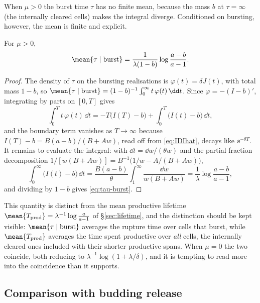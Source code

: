 When $\mu>0$ the burst time $\tau$ has no finite mean, because the mass $b$
at $\tau=\infty$ (the internally cleared cells) makes the integral diverge.
Conditioned on bursting, however, the mean is finite and explicit.

\begin{proposition}
\label{prop:tau-burst}
For $\mu>0$,
\begin{equation}
\mean{\tau\mid\text{burst}}
=\frac{1}{\lambda(1-b)}\log\frac{a-b}{a-1}.
\label{eq:tau-burst}
\end{equation}
\end{proposition}

\begin{proof}
The density of $\tau$ on the bursting realisations is $\varphi(t)=\delta J(t)$,
with total mass $1-b$, so
$\mean{\tau\mid\text{burst}}=(1-b)^{-1}\int_0^\infty t\,\varphi(t)\,\dd t$.
Since $\varphi=-(I-b)'$, integrating by parts on $[0,T]$ gives
$$\int_0^T t\,\varphi(t)\,\dd t
=-T\bigl(I(T)-b\bigr)+\int_0^T\bigl(I(t)-b\bigr)\,\dd t,$$
and the boundary term vanishes as $T\to\infty$ because
$I(T)-b=B(a-b)/(B+Aw)$, read off from \eqref{eq:IDIhat}, decays like
$\ee^{-\theta T}$. It remains to evaluate the integral: with
$\dd t=\dd w/(\theta w)$ and the partial-fraction decomposition
$1/[w(B+Aw)]=B^{-1}\bigl(1/w-A/(B+Aw)\bigr)$,
$$\int_0^\infty\bigl(I(t)-b\bigr)\,\dd t
=\frac{B(a-b)}{\theta}\int_1^\infty\frac{\dd w}{w(B+Aw)}
=\frac{1}{\lambda}\log\frac{a-b}{a-1},$$
and dividing by $1-b$ gives \eqref{eq:tau-burst}.
\end{proof}

This quantity is distinct from the mean productive lifetime
$\mean{T_{\rm prod}}=\lambda^{-1}\log\frac{a}{a-1}$ of
\S\ref{sec:lifetime}, and the distinction should be kept visible:
$\mean{\tau\mid\text{burst}}$ averages the rupture time over cells that
burst, while $\mean{T_{\rm prod}}$ averages the time spent productive over
\textit{all} cells, the internally cleared ones included with their shorter
productive spans. When $\mu=0$ the two coincide, both reducing to
$\lambda^{-1}\log(1+\lambda/\delta)$, and it is tempting to read more into
the coincidence than it supports.

\subsection{Comparison with budding release}
\label{sec:bud-vs-burst-single-cell}

